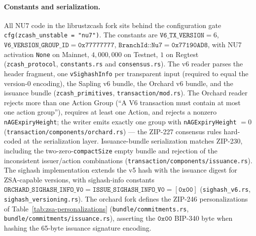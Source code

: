 \documentclass[11pt,a4paper]{article}
\theoremstyle{definition}
\begin{document}
\paragraph{Constants and serialization.} All NU7 code in the librustzcash
fork sits behind the configuration gate
\texttt{cfg(zcash\_unstable = "nu7")}. The constants are
$\texttt{V6\_TX\_VERSION} = 6$, $\texttt{V6\_VERSION\_GROUP\_ID} =
\mathtt{0x77777777}$, $\texttt{BranchId::Nu7} = \mathtt{0x77190AD8}$, with
NU7 activation \texttt{None} on Mainnet, $4{,}000{,}000$ on Testnet, $1$ on
Regtest (\texttt{zcash\_protocol}, \texttt{constants.rs} and
\texttt{consensus.rs}). The v6 reader parses the header fragment, one
\texttt{vSighashInfo} per transparent input (required to equal the version-0
encoding), the Sapling v6 bundle, the Orchard v6 bundle, and the issuance
bundle (\texttt{zcash\_primitives}, \texttt{transaction/mod.rs}). The
Orchard reader rejects more than one Action Group (``A V6 transaction must
contain at most one action group''), requires at least one Action, and
rejects a nonzero \texttt{nAGExpiryHeight}; the writer emits exactly one
group with \texttt{nAGExpiryHeight} $= 0$
(\texttt{transaction/components/orchard.rs}) --- the ZIP-227 consensus rules
hard-coded at the serialization layer. Issuance-bundle serialization matches
ZIP-230, including the two-zero-\texttt{compactSize} empty bundle and
rejection of the inconsistent issuer/action combinations
(\texttt{transaction/components/issuance.rs}). The sighash implementation
extends the v5 hash with the issuance digest for ZSA-capable versions, with
sighash-info constants $\texttt{ORCHARD\_SIGHASH\_INFO\_V0} =
\texttt{ISSUE\_SIGHASH\_INFO\_V0} = [\mathtt{0x00}]$
(\texttt{sighash\_v6.rs}, \texttt{sighash\_versioning.rs}). The orchard fork
defines the ZIP-246 personalizations of
Table~\ref{tab:zsa-personalizations} (\texttt{bundle/commitments.rs},
\texttt{bundle/commitments/issuance.rs}), asserting the $\mathtt{0x00}$
BIP-340 byte when hashing the 65-byte issuance signature encoding.
\end{document}
